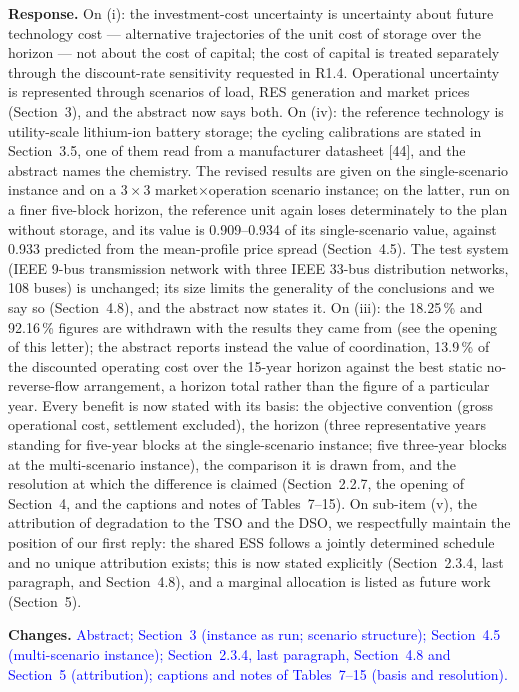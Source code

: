\documentclass[11pt]{article}
\newcommand{\rresponse}[1]{\noindent\textbf{Response.} #1\par\smallskip}
\newcommand{\rchanges}[1]{\noindent\textbf{Changes.} \textcolor{blue}{#1}\par\medskip}
\begin{document}
\rresponse{
On (i): the investment-cost uncertainty is uncertainty about future technology cost --- alternative trajectories of the unit cost of storage over the horizon --- not about the cost of capital; the cost of capital is treated separately through the discount-rate sensitivity requested in R1.4. Operational uncertainty is represented through scenarios of load, RES generation and market prices (Section~3), and
the abstract now says both. 
On (iv): the reference technology is utility-scale lithium-ion battery storage; the cycling calibrations are stated in Section~3.5, one of them read from a manufacturer datasheet [44], and the abstract names the chemistry. The revised results are given on the single-scenario instance and on a $3\times3$ market$\times$operation scenario instance; 
on the latter, run on a finer five-block horizon, the reference unit again loses determinately to the plan without storage, and its value is 0.909--0.934 of its single-scenario value, against 0.933 predicted from the mean-profile price spread (Section~4.5). The test system (IEEE 9-bus transmission network with three IEEE 33-bus distribution networks, 108 buses) is unchanged; its size
limits the generality of the conclusions and we say so (Section~4.8), and the abstract now states it.
On (iii): the 18.25\,\% and 92.16\,\% figures are withdrawn with the results they came from (see the opening of this letter); the abstract reports instead the value of coordination, 13.9\,\% of the discounted operating cost over the 15-year horizon against the best static no-reverse-flow arrangement, a horizon total rather than the figure of a particular year.
Every benefit is now stated with its basis: the objective convention (gross operational cost, settlement excluded), the horizon (three representative years standing for five-year blocks at the single-scenario instance; five three-year blocks at the multi-scenario instance), the comparison it is drawn from, and the resolution at which the difference is claimed (Section~2.2.7, the opening of Section~4, and the captions and notes of Tables~7--15).
On sub-item (v), the attribution of degradation to the TSO and the DSO, we respectfully maintain the position of our first reply: the shared ESS follows a jointly determined schedule and no unique attribution exists; this is now stated explicitly (Section~2.3.4, last paragraph, and Section~4.8), and a marginal allocation is listed as future work (Section~5).
}

\rchanges{Abstract; Section~3 (instance as run; scenario structure); Section~4.5 (multi-scenario instance);
Section~2.3.4, last paragraph, Section~4.8 and Section~5 (attribution); captions and notes of Tables~7--15 (basis and resolution).}
\end{document}
